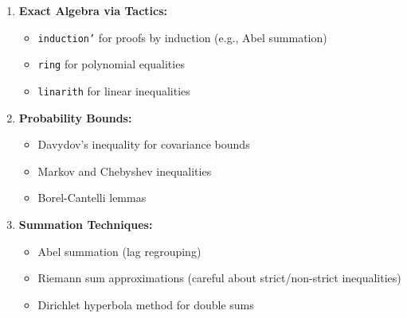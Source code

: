 \documentclass[11pt,a4paper]{amsart}
\theoremstyle{definition}
\begin{document}
\begin{enumerate}
\item \textbf{Exact Algebra via Tactics:}
\begin{itemize}
\item \texttt{induction'} for proofs by induction (e.g., Abel summation)
\item \texttt{ring} for polynomial equalities
\item \texttt{linarith} for linear inequalities
\end{itemize}

\item \textbf{Probability Bounds:}
\begin{itemize}
\item Davydov's inequality for covariance bounds
\item Markov and Chebyshev inequalities
\item Borel-Cantelli lemmas
\end{itemize}

\item \textbf{Summation Techniques:}
\begin{itemize}
\item Abel summation (lag regrouping)
\item Riemann sum approximations (careful about strict/non-strict inequalities)
\item Dirichlet hyperbola method for double sums
\end{itemize}
\end{enumerate}
\end{document}

